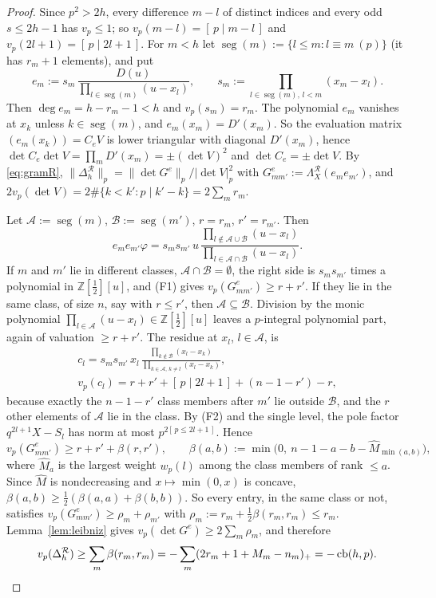 \documentclass[11pt]{amsart}
\theoremstyle{definition}
\theoremstyle{remark}
\numberwithin{equation}{section}
\newcommand{\ZZ}{\mathbb{Z}}
\newcommand{\cA}{\mathcal{A}}
\newcommand{\cR}{\mathcal{R}}
\newcommand{\ind}[1]{[\,#1\,]}
\newcommand{\cb}{\operatorname{cb}}
\begin{document}
\begin{proof}
Since $p^2>2h$, every difference $m-l$ of distinct indices and every odd $s\le2h-1$ has $v_p\le1$; so
$v_p(m-l)=\ind{p\mid m-l}$ and $v_p(2l+1)=\ind{p\mid2l+1}$. For $m<h$ let $\operatorname{seg}(m):=\{l\le m:l\equiv m\ (p)\}$
(it has $r_m+1$ elements), and put
\[
  e_m:=s_m\,\frac{D(u)}{\prod_{l\in\operatorname{seg}(m)}(u-x_l)},\qquad s_m:=\prod_{l\in\operatorname{seg}(m),\,l<m}(x_m-x_l).
\]
Then $\deg e_m=h-r_m-1<h$ and $v_p(s_m)=r_m$. The polynomial $e_m$ vanishes at $x_k$ unless $k\in\operatorname{seg}(m)$, and
$e_m(x_m)=D'(x_m)$. So the evaluation matrix $(e_m(x_k))=C_eV$ is lower triangular with diagonal $D'(x_m)$, hence
$\det C_e\det V=\prod_mD'(x_m)=\pm(\det V)^2$ and $\det C_e=\pm\det V$. By \eqref{eq:gramR},
$\|\Delta^{\cR}_h\|_p=\|\det G^e\|_p/|\det V|_p^2$ with $G^e_{mm'}:=\Lambda^{\cR}_X(e_me_{m'})$, and
$2v_p(\det V)=2\#\{k<k':p\mid k'-k\}=2\sum_mr_m$.

Let $\cA:=\operatorname{seg}(m)$, $\mathcal B:=\operatorname{seg}(m')$, $r=r_m$, $r'=r_{m'}$. Then
\[
  e_me_{m'}\varphi=s_ms_{m'}\,u\,\frac{\prod_{l\notin\cA\cup\mathcal B}(u-x_l)}{\prod_{l\in\cA\cap\mathcal B}(u-x_l)} .
\]
If $m$ and $m'$ lie in different classes, $\cA\cap\mathcal B=\emptyset$, the right side is $s_ms_{m'}$ times a polynomial in
$\ZZ[\frac12][u]$, and (F1) gives $v_p(G^e_{mm'})\ge r+r'$. If they lie in the same class, of size $n$, say with
$r\le r'$, then $\cA\subseteq\mathcal B$. Division by the monic polynomial $\prod_{l\in\cA}(u-x_l)\in\ZZ[\frac12][u]$ leaves a
$p$-integral polynomial part, again of valuation $\ge r+r'$. The residue at $x_l$, $l\in\cA$, is
\begin{gather*}
  c_l=s_ms_{m'}\,x_l\,\frac{\prod_{k\notin\mathcal B}(x_l-x_k)}{\prod_{k\in\cA,\,k\ne l}(x_l-x_k)},\\
  v_p(c_l)=r+r'+\ind{p\mid2l+1}+(n-1-r')-r,
\end{gather*}
because exactly the $n-1-r'$ class members after $m'$ lie outside $\mathcal B$, and the $r$ other elements of $\cA$ lie in
the class. By (F2) and the single level, the pole factor $q^{2l+1}X-S_l$ has norm at most $p^{2\ind{p\le2l+1}}$. Hence
\[
  v_p(G^e_{mm'})\ge r+r'+\beta(r,r'),\qquad \beta(a,b):=\min\bigl(0,\ n-1-a-b-\widehat M_{\min(a,b)}\bigr),
\]
where $\widehat M_a$ is the largest weight $w_p(l)$ among the class members of rank $\le a$. Since $\widehat M$ is
nondecreasing and $x\mapsto\min(0,x)$ is concave, $\beta(a,b)\ge\frac12(\beta(a,a)+\beta(b,b))$. So every entry, in
the same class or not, satisfies $v_p(G^e_{mm'})\ge\rho_m+\rho_{m'}$ with $\rho_m:=r_m+\frac12\beta(r_m,r_m)\le r_m$.
Lemma~\ref{lem:leibniz} gives $v_p(\det G^e)\ge2\sum_m\rho_m$, and therefore
\[
  v_p(\Delta^{\cR}_h)\ge\sum_m\beta(r_m,r_m)=-\sum_m(2r_m+1+M_m-n_m)_+=-\cb(h,p).\qedhere
\]
\end{proof}
\end{document}
